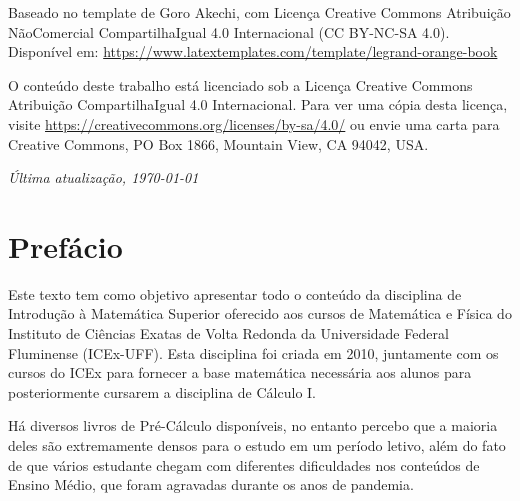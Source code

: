 \noindent Baseado no template de Goro Akechi, com Licença Creative Commons Atribuição NãoComercial CompartilhaIgual 4.0 Internacional (CC BY-NC-SA 4.0). Disponível em: \url{https://www.latextemplates.com/template/legrand-orange-book} %

\vspace{.5cm}


\vspace{.5cm}
\noindent O conteúdo deste trabalho está licenciado sob a Licença Creative Commons Atribuição CompartilhaIgual 4.0 Internacional. Para ver uma cópia desta licença, visite
\url{https://creativecommons.org/licenses/by-sa/4.0/} ou envie uma carta para Creative Commons, PO Box 1866, Mountain View, CA 94042, USA. %

\vspace{.5cm}
\noindent \textit{Última atualização, \today} %


\pagestyle{empty} %

\chapter*{Prefácio}

Este texto tem como objetivo apresentar todo o conteúdo da disciplina de Introdução à Matemática Superior oferecido aos cursos de Matemática e Física do Instituto de Ciências Exatas de Volta Redonda da Universidade Federal Fluminense (ICEx-UFF). Esta disciplina foi criada em 2010, juntamente com os cursos do ICEx para fornecer a base matemática necessária aos alunos para posteriormente cursarem a disciplina de Cálculo I.

Há diversos livros de Pré-Cálculo disponíveis, no entanto percebo que a maioria deles são extremamente densos para o estudo em um período letivo, além do fato de que vários estudante chegam com diferentes dificuldades nos conteúdos de Ensino Médio, que foram agravadas durante os anos de pandemia.

